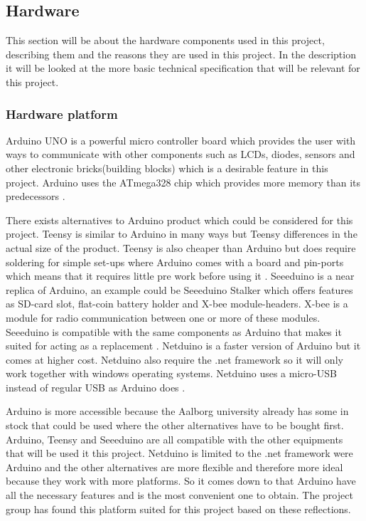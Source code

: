 \subsection{Hardware}
This section will be about the hardware components used in this project, describing them and the reasons they are used in this project. In the description it will be looked at the more basic technical specification that will be relevant for this project.

\subsubsection{Hardware platform}
\label{sec:hardwarearduino}
Arduino UNO is a powerful micro controller board which provides the user with ways to communicate with other components such as LCDs, diodes, sensors and other electronic bricks(building blocks) which is a desirable feature in this project. Arduino uses the ATmega328 chip which provides more memory than its predecessors \citep{ArduinoUno}.

There exists alternatives to Arduino product which could be considered for this project. Teensy is similar to Arduino in many ways but Teensy differences in the actual size of the product. Teensy is also cheaper than Arduino but does require soldering for simple set-ups where Arduino comes with a board and pin-ports which means that it requires little pre work before using it \citep{Teensy}.
Seeeduino is a near replica of Arduino, an example could be Seeeduino Stalker which offers features as SD-card slot, flat-coin battery holder and X-bee module-headers. X-bee is a module for radio communication between one or more of these modules. Seeeduino is compatible with the same components as 
Arduino that makes it suited for acting as a replacement \citep{Seedui}.
Netduino is a faster version of Arduino but it comes at higher cost. Netduino also require the .net framework so it will only work together with windows operating systems. Netduino uses a micro-USB instead of regular USB as Arduino does \citep{Netdui}.

Arduino is more accessible because the Aalborg university already has some in stock that could be used where the other alternatives have to be bought first. Arduino, Teensy and Seeeduino are all compatible with the other equipments that will be used it this project. Netduino is limited to the .net framework were Arduino and the other alternatives are more flexible and therefore more ideal because they work with more platforms.
So it comes down to that Arduino have all the necessary features and is the most convenient one to obtain. The project group has found this platform suited for this project based on these reflections. 

